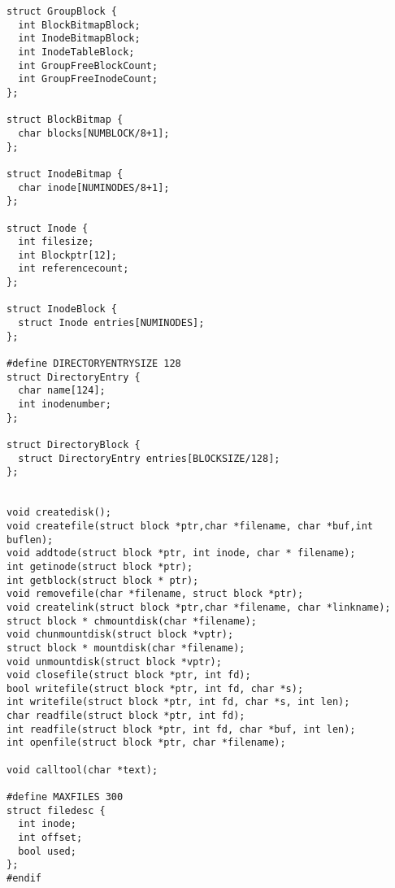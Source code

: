 \documentclass{article}
\begin{document}
\begin{flushleft}
\begin{verbatim}
struct GroupBlock {
  int BlockBitmapBlock;
  int InodeBitmapBlock;
  int InodeTableBlock;
  int GroupFreeBlockCount;
  int GroupFreeInodeCount;
};

struct BlockBitmap {
  char blocks[NUMBLOCK/8+1];
};

struct InodeBitmap {
  char inode[NUMINODES/8+1];
};

struct Inode {
  int filesize;
  int Blockptr[12];
  int referencecount;
};

struct InodeBlock {
  struct Inode entries[NUMINODES];
};

#define DIRECTORYENTRYSIZE 128
struct DirectoryEntry {
  char name[124];
  int inodenumber;
};

struct DirectoryBlock {
  struct DirectoryEntry entries[BLOCKSIZE/128];
};


void createdisk();
void createfile(struct block *ptr,char *filename, char *buf,int buflen);
void addtode(struct block *ptr, int inode, char * filename);
int getinode(struct block *ptr);
int getblock(struct block * ptr);
void removefile(char *filename, struct block *ptr);
void createlink(struct block *ptr,char *filename, char *linkname);
struct block * chmountdisk(char *filename);
void chunmountdisk(struct block *vptr);
struct block * mountdisk(char *filename);
void unmountdisk(struct block *vptr);
void closefile(struct block *ptr, int fd);
bool writefile(struct block *ptr, int fd, char *s);
int writefile(struct block *ptr, int fd, char *s, int len);
char readfile(struct block *ptr, int fd);
int readfile(struct block *ptr, int fd, char *buf, int len);
int openfile(struct block *ptr, char *filename);

void calltool(char *text);

#define MAXFILES 300
struct filedesc {
  int inode;
  int offset;
  bool used;
};
#endif
\end{verbatim}


\end{flushleft}
\end{document}
